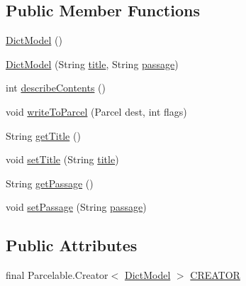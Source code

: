 \subsection*{Public Member Functions}
\begin{DoxyCompactItemize}
\item 
\hyperlink{classorg_1_1buildmlearn_1_1dictation_1_1data_1_1DictModel_a6d125a46e3f968eab7e28fbe3305bd3c}{Dict\+Model} ()
\item 
\hyperlink{classorg_1_1buildmlearn_1_1dictation_1_1data_1_1DictModel_abf6f21917ef9b7e42ade9feb503aca76}{Dict\+Model} (String \hyperlink{classorg_1_1buildmlearn_1_1dictation_1_1data_1_1DictModel_a6dff5f3fd1ed4d80623367c54a5aef25}{title}, String \hyperlink{classorg_1_1buildmlearn_1_1dictation_1_1data_1_1DictModel_a6b9ba2d7f22e05f502fc1a0d8f87fa07}{passage})
\item 
int \hyperlink{classorg_1_1buildmlearn_1_1dictation_1_1data_1_1DictModel_a9c0eece4af0a4e81c2b8603a8271280f}{describe\+Contents} ()
\item 
void \hyperlink{classorg_1_1buildmlearn_1_1dictation_1_1data_1_1DictModel_a0fa4d0c753c3cde01c0d93f26ebc2c02}{write\+To\+Parcel} (Parcel dest, int flags)
\item 
String \hyperlink{classorg_1_1buildmlearn_1_1dictation_1_1data_1_1DictModel_a65f4264bc399a5607a3d34a810251c44}{get\+Title} ()
\item 
void \hyperlink{classorg_1_1buildmlearn_1_1dictation_1_1data_1_1DictModel_a5708a85af19487bdebab687eae614330}{set\+Title} (String \hyperlink{classorg_1_1buildmlearn_1_1dictation_1_1data_1_1DictModel_a6dff5f3fd1ed4d80623367c54a5aef25}{title})
\item 
String \hyperlink{classorg_1_1buildmlearn_1_1dictation_1_1data_1_1DictModel_a787897f1ba7ca28f8082decb302bab3a}{get\+Passage} ()
\item 
void \hyperlink{classorg_1_1buildmlearn_1_1dictation_1_1data_1_1DictModel_ae28d74ebf3b2c72fff0684e6ac7fe22e}{set\+Passage} (String \hyperlink{classorg_1_1buildmlearn_1_1dictation_1_1data_1_1DictModel_a6b9ba2d7f22e05f502fc1a0d8f87fa07}{passage})
\end{DoxyCompactItemize}
\subsection*{Public Attributes}
\begin{DoxyCompactItemize}
\item 
final Parcelable.\+Creator$<$ \hyperlink{classorg_1_1buildmlearn_1_1dictation_1_1data_1_1DictModel}{Dict\+Model} $>$ \hyperlink{classorg_1_1buildmlearn_1_1dictation_1_1data_1_1DictModel_a824a308a5003ec6a93b6f1a89f393267}{C\+R\+E\+A\+T\+OR}
\end{DoxyCompactItemize}
